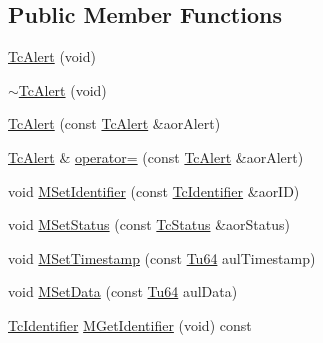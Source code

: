 \subsection*{Public Member Functions}
\begin{DoxyCompactItemize}
\item 
\mbox{\hyperlink{class_g_n_common_1_1_n_notification_1_1_tc_alert_a683af178a44e0ab7463c529d1ebb6d9c}{Tc\+Alert}} (void)
\item 
\mbox{\hyperlink{class_g_n_common_1_1_n_notification_1_1_tc_alert_abd42f842fe53942ed6d7a7008c3400c2}{$\sim$\+Tc\+Alert}} (void)
\item 
\mbox{\hyperlink{class_g_n_common_1_1_n_notification_1_1_tc_alert_a75120f1735cec51fe7f4afa519bd631b}{Tc\+Alert}} (const \mbox{\hyperlink{class_g_n_common_1_1_n_notification_1_1_tc_alert}{Tc\+Alert}} \&aor\+Alert)
\item 
\mbox{\hyperlink{class_g_n_common_1_1_n_notification_1_1_tc_alert}{Tc\+Alert}} \& \mbox{\hyperlink{class_g_n_common_1_1_n_notification_1_1_tc_alert_ad1371ff2988283b60a47c2879e1a0011}{operator=}} (const \mbox{\hyperlink{class_g_n_common_1_1_n_notification_1_1_tc_alert}{Tc\+Alert}} \&aor\+Alert)
\item 
void \mbox{\hyperlink{class_g_n_common_1_1_n_notification_1_1_tc_alert_a5411a5d9659282e199ceb16a1b88c17d}{M\+Set\+Identifier}} (const \mbox{\hyperlink{class_g_n_common_1_1_n_notification_1_1_tc_identifier}{Tc\+Identifier}} \&aor\+ID)
\item 
void \mbox{\hyperlink{class_g_n_common_1_1_n_notification_1_1_tc_alert_a682a17a50fc2c50bfb92ec3eeafdb5c9}{M\+Set\+Status}} (const \mbox{\hyperlink{class_g_n_common_1_1_n_notification_1_1_tc_status}{Tc\+Status}} \&aor\+Status)
\item 
void \mbox{\hyperlink{class_g_n_common_1_1_n_notification_1_1_tc_alert_ac6ed25087bcdbb12921d71c2c4126131}{M\+Set\+Timestamp}} (const \mbox{\hyperlink{namespace_g_n_common_a9404ee6090c788ae70aebd1436ceb97d}{Tu64}} aul\+Timestamp)
\item 
void \mbox{\hyperlink{class_g_n_common_1_1_n_notification_1_1_tc_alert_af4dccb7b428fdd2069a9dd1e6c12410b}{M\+Set\+Data}} (const \mbox{\hyperlink{namespace_g_n_common_a9404ee6090c788ae70aebd1436ceb97d}{Tu64}} aul\+Data)
\item 
\mbox{\hyperlink{class_g_n_common_1_1_n_notification_1_1_tc_identifier}{Tc\+Identifier}} \mbox{\hyperlink{class_g_n_common_1_1_n_notification_1_1_tc_alert_a3387c702b35bffddf5a480cdd52498aa}{M\+Get\+Identifier}} (void) const
\item 

\end{DoxyCompactItemize}
